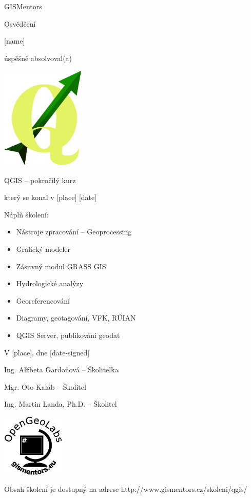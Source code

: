 \documentclass[12pt, a4paper]{letter}
\begin{document}
\pagestyle{empty}
\begin{center}

{\Large GISMentors}

{\Huge Osvědčení}

{\Large [name]}

úspěšně absolvoval(a)

\includegraphics[width=0.30\textwidth]{../images/qgislogo_vector.eps}

{\Large QGIS -- pokročilý kurz}

který se konal v [place] [date]
\end{center}

Náplň školení:

\begin{itemize}
    \item Nástroje zpracování -- Geoprocessing
    \item Grafický modeler
    \item Zásuvný modul GRASS GIS
    \item Hydrologické analýzy
    \item Georeferencování
    \item Diagramy, geotagování, VFK, RÚIAN
    \item QGIS Server, publikování geodat
\end{itemize}

\vfill
\parbox{7cm}{

    V [place], dne [date-signed]\\

\vfill

    Ing. Alžbeta Gardoňová -- Školitelka\\

\vfill
    
    Mgr. Oto Kaláb -- Školitel \\

\vfill
    
    Ing. Martin Landa, Ph.D. -- Školitel

}
\hfill
\parbox{3cm}{
    \includegraphics[width=3cm]{../images/placka.eps}
}


\begin{center}
{\footnotesize Obsah školení je dostupný na adrese
http://www.gismentors.cz/skoleni/qgis/}
\end{center}
\end{document}
